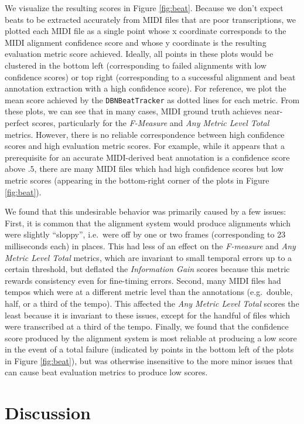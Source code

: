 \documentclass{article}
\begin{document}
We visualize the resulting scores in Figure \ref{fig:beat}.
Because we don't expect beats to be extracted accurately from MIDI files that are poor transcriptions, we plotted each MIDI file as a single point whose x coordinate corresponds to the MIDI alignment confidence score and whose y coordinate is the resulting evaluation metric score achieved.
Ideally, all points in these plots would be clustered in the bottom left (corresponding to failed alignments with low confidence scores) or top right (corresponding to a successful alignment and beat annotation extraction with a high confidence score).
For reference, we plot the mean score achieved by the \texttt{DBNBeatTracker} as dotted lines for each metric.
From these plots, we can see that in many cases, MIDI ground truth achieves near-perfect scores, particularly for the {\em F-Measure} and {\em Any Metric Level Total} metrics.
However, there is no reliable correspondence between high confidence scores and high evaluation metric scores.
For example, while it appears that a prerequisite for an accurate MIDI-derived beat annotation is a confidence score above $.5$, there are many MIDI files which had high confidence scores but low metric scores (appearing in the bottom-right corner of the plots in Figure \ref{fig:beat}).

We found that this undesirable behavior was primarily caused by a few issues:
First, it is common that the alignment system would produce alignments which were slightly ``sloppy'', i.e.\ were off by one or two frames (corresponding to 23 milliseconds each) in places.
This had less of an effect on the {\em F-measure} and {\em Any Metric Level Total} metrics, which are invariant to small temporal errors up to a certain threshold, but deflated the {\em Information Gain} scores because this metric rewards consistency even for fine-timing errors.
Second, many MIDI files had tempos which were at a different metric level than the annotations (e.g.\ double, half, or a third of the tempo).
This affected the {\em Any Metric Level Total} scores the least because it is invariant to these issues, except for the handful of files which were transcribed at a third of the tempo.
Finally, we found that the confidence score produced by the alignment system is most reliable at producing a low score in the event of a total failure (indicated by points in the bottom left of the plots in Figure \ref{fig:beat}), but was otherwise insensitive to the more minor issues that can cause beat evaluation metrics to produce low scores.

\section{Discussion}
\label{sec:discussion}
\end{document}
